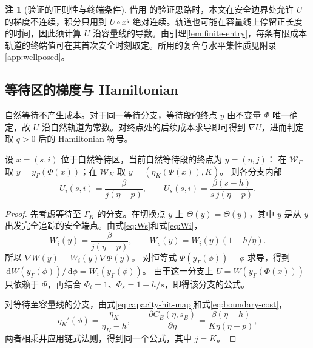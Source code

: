 \documentclass[lang=cn,a4paper,newtx]{elegantpaper}
\theoremstyle{plain}
\theoremstyle{definition}
\newtheorem{paperremark}[theorem]{注}
\newcommand{\dd}{\,\mathrm d}
\begin{document}
\begin{paperremark}[验证的正则性与终端条件]
\label{rem:verification-principle-msw}
借用 \textcite[附录A.1]{MicloSpiroWeibull2022} 的验证思路时，本文在安全边界处允许 $U$ 的梯度不连续，积分只用到 $U\circ x^q$ 绝对连续。轨道也可能在容量线上停留正长度的时间，因此须计算 $U$ 沿容量线的导数。由引理\ref{lem:finite-entry}，每条有限成本轨道的终端值可在其首次安全时刻取定。所用的复合与水平集性质见附录\ref{app:wellposed}。
\end{paperremark}

\subsection{等待区的梯度与 Hamiltonian}
\label{sec:verification-details}
自然等待不产生成本。对于同一等待分支，等待段的终点 $y$ 由不变量 $\Phi$ 唯一确定，故 $U$ 沿自然轨道为常数。对终点处的后续成本求导即可得到 $\nabla U$，进而判定取 $q>0$ 后的 Hamiltonian 符号。

\begin{lemma}[等待区的梯度]
\label{lem:waiting-gradient}
设 $x=(s,i)$ 位于自然等待区，当前自然等待段的终点为 $y=(\eta,j)$：
在 $\mathcal W_\Gamma$ 取 $y=y_\Gamma(\Phi(x))$；在 $\mathcal W_K$ 取 $y=(\eta_K(\Phi(x)),K)$。
则各分支内部
\begin{equation}
U_i(s,i)=\frac{\beta}{j(\eta-p)},\qquad
U_s(s,i)=\frac{\beta(s-h)}{s\,j(\eta-p)}.
\label{eq:waiting-gradient}
\end{equation}
\end{lemma}
\begin{proof}
先考虑等待至 $\Gamma_K$ 的分支。在切换点 $y$ 上 $\Theta(y)=\Theta(\bar y)$，其中 $\bar y$ 是从 $y$ 出发完全追踪的安全端点。由式\eqref{eq:Ws}和式\eqref{eq:Wi}，
\[
W_i(y)=\frac \beta{j(\eta-p)},\qquad
W_s(y)=W_i(y)(1-h/\eta).
\]
所以 $\nabla W(y)=W_i(y)\nabla\Phi(y)$。
对恒等式 $\Phi(y_\Gamma(\phi))=\phi$ 求导，得到 $\dd W(y_\Gamma(\phi))/\dd\phi=W_i(y_\Gamma(\phi))$。
由于这一分支上 $U=W(y_\Gamma(\Phi(x)))$ 只依赖于 $\Phi$，再结合 $\Phi_i=1$、$\Phi_s=1-h/s$，即得该分支的公式。

对等待至容量线的分支，由式\eqref{eq:capacity-hit-map}和式\eqref{eq:boundary-cost}，
\[
\eta_K'(\phi)=\frac{\eta_K}{\eta_K-h},\qquad
\frac{\partial C_B(\eta,s_B)}{\partial\eta}
=\frac{\beta(\eta-h)}{K\eta(\eta-p)},
\]
两者相乘并应用链式法则，得到同一个公式，其中 $j=K$。
\end{proof}
\end{document}
